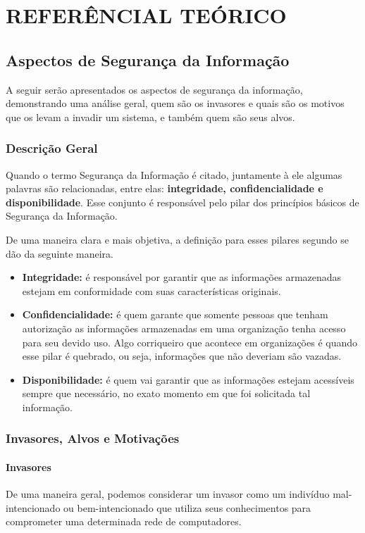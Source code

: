 \chapter{REFERÊNCIAL TEÓRICO}

\section{Aspectos de Segurança da Informação}
A seguir serão apresentados os aspectos de segurança da informação, demonstrando uma análise geral, quem são os invasores e quais são os motivos que os levam a invadir um sistema, e também quem são seus alvos.

\subsection{Descrição Geral}
Quando o termo Segurança da Informação é citado, juntamente à ele algumas palavras são relacionadas, entre elas: \textbf{integridade, confidencialidade e disponibilidade}. Esse conjunto é responsável pelo pilar dos princípios básicos de Segurança da Informação.

De uma maneira clara e mais objetiva, a definição para esses pilares segundo  se dão da seguinte maneira.

\begin{itemize}
\item \textbf{Integridade:} é responsável por garantir que as informações armazenadas estejam em conformidade com suas características originais.

\item \textbf{Confidencialidade:} é quem garante que somente pessoas que tenham autorização as informações armazenadas em uma organização tenha acesso para seu devido uso. Algo corriqueiro que acontece em organizações é quando esse pilar é quebrado, ou seja, informações que não deveriam são vazadas.

\item \textbf{Disponibilidade:} é quem vai garantir que as informações estejam acessíveis sempre que necessário, no exato momento em que foi solicitada tal informação.
\end{itemize} 

\subsection{Invasores, Alvos e Motivações}
\subsubsection{Invasores}
De uma maneira geral, podemos considerar um invasor como um indivíduo mal-intencionado ou bem-intencionado que utiliza seus conhecimentos para comprometer uma determinada rede de computadores.

